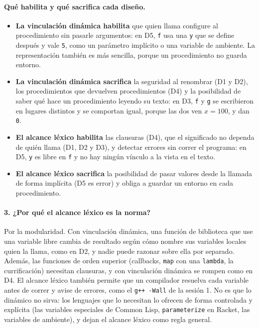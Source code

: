 \documentclass[a4paper, 10pt]{article}
\newcommand{\ttt}[1]{\texttt{#1}}
\begin{document}
\paragraph{Qué habilita y qué sacrifica cada diseño.}
\begin{itemize}
  \item \textbf{La vinculación dinámica habilita} que quien llama configure al
    procedimiento sin pasarle argumentos: en D5, \ttt{f} usa una \ttt{y} que se define
    después y vale \ttt{5}, como un parámetro implícito o una variable de ambiente. La
    representación también es más sencilla, porque un procedimiento no guarda entorno.
  \item \textbf{La vinculación dinámica sacrifica} la seguridad al renombrar (D1 y D2),
    los procedimientos que devuelven procedimientos (D4) y la posibilidad de saber qué
    hace un procedimiento leyendo su texto: en D3, \ttt{f} y \ttt{g} se escribieron en
    lugares distintos y se comportan igual, porque las dos ven $x=100$, y dan \ttt{0}.
  \item \textbf{El alcance léxico habilita} las clausuras (D4), que el significado no
    dependa de quién llama (D1, D2 y D3), y detectar errores sin correr el programa: en
    D5, \ttt{y} es libre en \ttt{f} y no hay ningún vínculo a la vista en el texto.
  \item \textbf{El alcance léxico sacrifica} la posibilidad de pasar valores desde la
    llamada de forma implícita (D5 es error) y obliga a guardar un entorno en cada
    procedimiento.
\end{itemize}

\paragraph{3. ¿Por qué el alcance léxico es la norma?}
Por la modularidad. Con vinculación dinámica, una función de biblioteca que use una
variable libre cambia de resultado según cómo nombre sus variables locales quien la llama,
como en D2, y nadie puede razonar sobre ella por separado. Además, las funciones de orden
superior (callbacks, \ttt{map} con una \ttt{lambda}, la currificación) necesitan
clausuras, y con vinculación dinámica se rompen como en D4. El alcance léxico también
permite que un compilador resuelva cada variable antes de correr y avise de errores, como
el \ttt{g++ -Wall} de la sesión 1. No es que lo dinámico no sirva: los lenguajes que lo
necesitan lo ofrecen de forma controlada y explícita (las variables especiales de Common
Lisp, \ttt{parameterize} en Racket, las variables de ambiente), y dejan el alcance léxico
como regla general.
\end{document}
